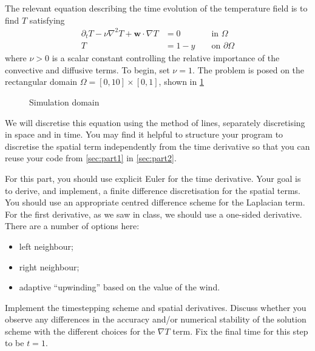 \documentclass[11pt,a4paper]{article}
\renewcommand{\vec}[1]{\ensuremath{\mathbf{#1}}}
\begin{document}
The relevant equation describing the time evolution of the temperature
field is to find $T$ satisfying
\begin{equation}
  \label{eq:1}
  \begin{aligned}
  \partial_t T - \nu \nabla^2 T + \vec{w} \cdot \nabla T &= 0 &&\text{ in } \Omega\\
  T &= 1 - y &&\text{ on } \partial\Omega
  \end{aligned}
\end{equation}
where $\nu > 0$ is a scalar constant controlling the relative
importance of the convective and diffusive terms. To begin, set
$\nu = 1$. The problem is posed on the rectangular domain
$\Omega = [0, 10] \times [0, 1]$, shown in \cref{fig:omega}
\begin{figure}[htbp]
  \centering
  \caption{Simulation domain}
  \label{fig:omega}
\end{figure}

We will discretise this equation using the method of lines, separately
discretising in space and in time. You may find it helpful to
structure your program to discretise the spatial term independently
from the time derivative so that you can reuse your code from
\cref{sec:part1} in \cref{sec:part2}.

For this part, you should use explicit Euler for the time derivative.
Your goal is to derive, and implement, a finite difference
discretisation for the spatial terms. You should use an appropriate
centred difference scheme for the Laplacian term. For the first
derivative, as we saw in class, we should use a one-sided derivative.
There are a number of options here:
\begin{itemize}
\item left neighbour;
\item right neighbour;
\item adaptive ``upwinding'' based on the value of the wind.
\end{itemize}
Implement the timestepping scheme and spatial derivatives. Discuss
whether you observe any differences in the accuracy and/or numerical
stability of the solution scheme with the different choices for the
$\nabla T$ term. Fix the final time for this step to be $t=1$.
\end{document}
